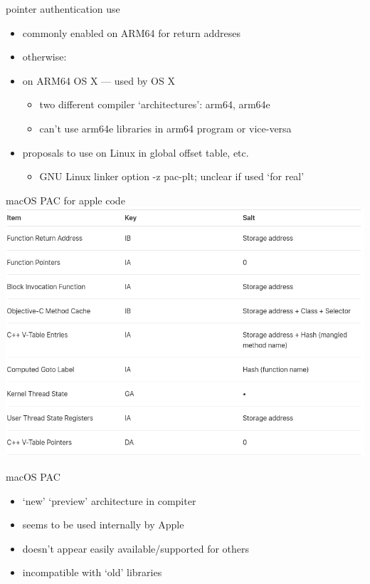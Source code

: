\begin{frame}{pointer authentication use}
    \begin{itemize}
    \item commonly enabled on ARM64 for return addreses
    \vspace{.25cm}
    \item otherwise:
    \item on ARM64 OS X --- used by OS X
        \begin{itemize}
        \item two different compiler `architectures': arm64, arm64e
        \item can't use arm64e libraries in arm64 program or vice-versa
        \end{itemize}
    \item proposals to use on Linux in global offset table, etc.
        \begin{itemize}
        \item GNU Linux linker option -z pac-plt; unclear if used `for real'
        \end{itemize}
    \end{itemize}
\end{frame}

\begin{frame}[fragile]{macOS PAC for apple code}
\includegraphics[height=0.9\textheight]{../cfi/apple-pac-usage}
\end{frame}

\begin{frame}{macOS PAC}
    \begin{itemize}
    \item `new' `preview' architecture in compiter
    \item seems to be used internally by Apple
    \item doesn't appear easily available/supported for others
    \item incompatible with `old' libraries
    \end{itemize}
\end{frame}


